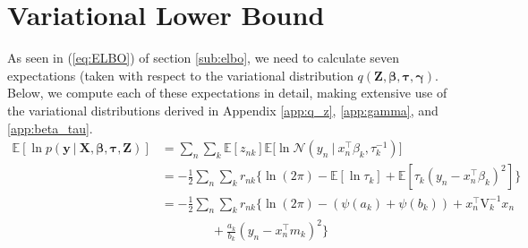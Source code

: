 \documentclass[twoside,11pt]{article}
\newcommand\given[1][]{\:#1\vert\:}
\newcommand{\transpose}[1]{#1^{\intercal}}
\newcommand{\nsum}{\sum_{n}}
\newcommand{\ksum}{\sum_{k}}
\newcommand{\boldbeta}{\boldsymbol\beta}
\newcommand{\boldgamma}{\boldsymbol\gamma}
\newcommand{\boldtau}{\boldsymbol\tau}
\newcommand{\E}{\mathbb{E}}
\newcommand{\pr}[1]{p \left( #1 \right)}
\begin{document}
\section{Variational Lower Bound} \label{app:elbo}  %
As seen in (\ref{eq:ELBO}) of section \ref{sub:elbo}, we need to calculate seven expectations (taken with respect to the variational distribution $q(\mathbf{Z}, \boldbeta, \boldtau, \boldgamma)$. Below, we compute each of these expectations in detail, making extensive use of the variational distributions derived in Appendix \ref{app:q_z}, \ref{app:gamma}, and \ref{app:beta_tau}. 
\begin{equation} \label{eq:e1_deriv}
\begin{split}
	\E[\ln\pr{\mathbf{y} \given \mathbf{X}, \boldbeta, \boldtau, \mathbf{Z}}] &= \nsum \ksum \E[z_{nk}] \E \Bigg[ \ln \mathcal{N}\left(y_n \given \transpose{x_n} \beta_k, \tau_k^{-1}\right)\Bigg]  \\
	&= -\frac{1}{2} \nsum \ksum r_{nk} \Big\{ \ln(2 \pi) - \E[\ln \tau_k] + \E[\tau_k \left( y_n - \transpose{x_n} \beta_k\right)^2]\Big\} \\
	&= -\frac{1}{2}\nsum \ksum r_{nk} \Big\{ \ln (2\pi) - (\psi(a_k) + \psi(b_k)) + \transpose{x_n}\mathrm{V}_k^{-1}x_n \\ & \qquad \qquad + \frac{a_k}{b_k}(y_n - \transpose{x_n}m_k)^2 \Big\}
\end{split}
\end{equation}
\end{document}
